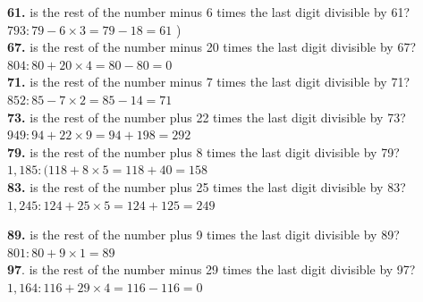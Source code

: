 \documentclass{article}
\begin{document}
\newpage

\textbf{61.} is the rest of the number minus 6 times the last digit divisible by 61?\\

\hspace{2ex}$793: 79 - 6 \times 3 = 79 - 18 = 61$ \Checkmark)\\

\textbf{67.} is the rest of the number minus 20 times the last digit divisible by 67?\\

\hspace{2ex}$804: 80 + 20 \times 4 = 80 - 80 = 0$ \Checkmark\\

\textbf{71.} is the rest of the number minus 7 times the last digit divisible by 71?\\

\hspace{2ex}$852: 85 - 7 \times 2 = 85 - 14 = 71$ \Checkmark\\

\textbf{73.} is the rest of the number plus 22 times the last digit divisible by 73?\\

\hspace{2ex}$949: 94 + 22 \times 9 = 94 + 198 = 292$ \Checkmark\\

\textbf{79.} is the rest of the number plus 8 times the last digit divisible by 79?\\

\hspace{2ex}$1,185: (118 + 8 \times 5 = 118 + 40 = 158$ \Checkmark\\

\textbf{83.} is the rest of the number plus 25 times the last digit divisible by 83?\\

\hspace{2ex}$1,245: 124 + 25 \times 5 = 124 + 125 = 249$ \Checkmark\\

\newpage

\textbf{89.} is the rest of the number plus 9 times the last digit divisible by 89?\\

\hspace{2ex}$801: 80 + 9 \times 1 = 89$ \Checkmark\\

\textbf{97}. is the rest of the number minus 29 times the last digit divisible by 97?\\

 \hspace{2ex}$1,164: 116 + 29 \times 4 = 116 - 116 = 0$ \Checkmark\\
 
\end{document}
